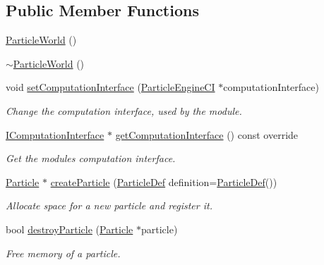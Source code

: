 \subsection*{Public Member Functions}
\begin{DoxyCompactItemize}
\item 
\mbox{\hyperlink{classr3_1_1_particle_world_a5cd4bf68559cd0e1194420d3233b095e}{Particle\+World}} ()
\item 
\mbox{\hyperlink{classr3_1_1_particle_world_a3a6d6f87b726156c41d4282c6dbb1e48}{$\sim$\+Particle\+World}} ()
\item 
void \mbox{\hyperlink{classr3_1_1_particle_world_adf5630d53659e9ced254d33990f15a9d}{set\+Computation\+Interface}} (\mbox{\hyperlink{classr3_1_1_particle_engine_c_i}{Particle\+Engine\+CI}} $\ast$computation\+Interface)
\begin{DoxyCompactList}\small\item\em Change the computation interface, used by the module. \end{DoxyCompactList}\item 
\mbox{\hyperlink{classr3_1_1_i_computation_interface}{I\+Computation\+Interface}} $\ast$ \mbox{\hyperlink{classr3_1_1_particle_world_a1e806bf89ec6445a54b9534f1efc081f}{get\+Computation\+Interface}} () const override
\begin{DoxyCompactList}\small\item\em Get the module\textquotesingle{}s computation interface. \end{DoxyCompactList}\item 
\mbox{\hyperlink{classr3_1_1_particle}{Particle}} $\ast$ \mbox{\hyperlink{classr3_1_1_particle_world_a467a56ef835bbd7c3a23b722db81fa5e}{create\+Particle}} (\mbox{\hyperlink{structr3_1_1_particle_def}{Particle\+Def}} definition=\mbox{\hyperlink{structr3_1_1_particle_def}{Particle\+Def}}())
\begin{DoxyCompactList}\small\item\em Allocate space for a new particle and register it. \end{DoxyCompactList}\item 
bool \mbox{\hyperlink{classr3_1_1_particle_world_a1802231868ed6d99dd677ef71328781a}{destroy\+Particle}} (\mbox{\hyperlink{classr3_1_1_particle}{Particle}} $\ast$particle)
\begin{DoxyCompactList}\small\item\em Free memory of a particle. \end{DoxyCompactList}\item 

\end{DoxyCompactItemize}
